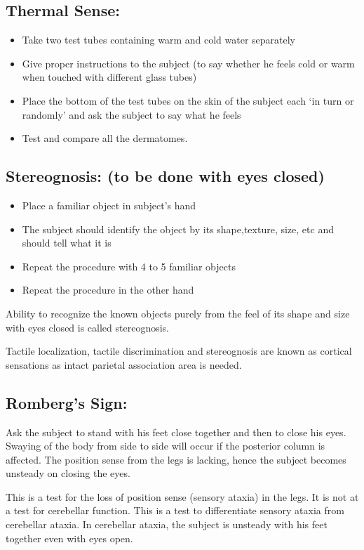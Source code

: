 \documentclass[a4paper,12pt,openany,oneside]{book}
\begin{document}
	\subsection*{Thermal Sense:}
	\begin{itemize}
\item{Take two test tubes containing warm and cold water separately}
\item{Give proper instructions to the subject (to say whether he feels cold or warm when touched with different glass tubes)}
\item{Place the bottom of the test tubes on the skin of the subject each ‘in turn or randomly’ and ask the subject to say what he feels}
\item{Test and compare all the dermatomes.}
	\end{itemize}
	\subsection*{Stereognosis: (to be done with eyes closed)}
\begin{itemize}
\item{Place a familiar object in subject’s hand}
\item{The subject should identify the object by its shape,texture, size, etc and should tell what it is}
\item{Repeat the procedure with 4 to 5 familiar objects}
\item{Repeat the procedure in the other hand}
	\end{itemize}
	\par
	Ability to recognize the known objects purely from the feel of its shape and size with eyes closed is called stereognosis.
	\par
	Tactile localization, tactile discrimination and stereognosis are known as cortical sensations as intact parietal association area is needed.
\subsection*{Romberg’s Sign:}
\par
	Ask the subject to stand with his feet close together and then to close his eyes. Swaying of the body from side to side will occur if the posterior column is affected. The position sense from the legs is lacking, hence the subject becomes unsteady on closing the eyes.
	\par
	This is a test for the loss of position sense (sensory ataxia) in the legs. It is not at a test for cerebellar function. This is a test to differentiate sensory ataxia from cerebellar ataxia. In cerebellar ataxia, the subject is unsteady with his feet together even with eyes open.
\end{document}
